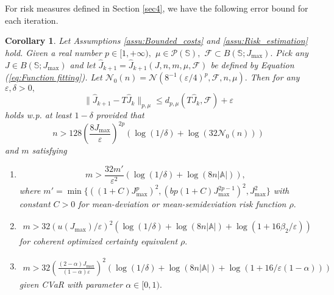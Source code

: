 \documentclass[12pt,technote,onecolumn]{IEEEtran}
\newtheorem{corollary}{Corollary}
\begin{document}
For risk measures defined in Section \ref{sec4}, we have the
following error bound for each iteration.
\begin{corollary}
	\label{cor:Error each iteration} Let Assumptions \ref{assu:Bounded_costs}
	and \ref{assu:Risk_estimation} hold. Given a real number $p\in[1,+\infty),$
	$\mu\in\mathcal{P}(\mathbb{S}),$ $\mathcal{F}\subset B(\mathbb{S};J_{\max}).$
	Pick any $J\in B\left(\mathbb{S};J_{\max}\right)$ and let $\widehat{J}_{k+1}=\widehat{J}_{k+1}\left(J,n,m,\mu,\mathcal{F}\right)$
	be defined by Equation (\ref{eq:Function fitting}). Let $\mathcal{N}_{0}(n)=\mathcal{N}(8^{-1}({\varepsilon}/{4})^{p},\mathcal{F},n,\mu).$
	Then for any $\varepsilon,\delta>0,$	
	\[
	\|\widehat{J}_{k+1}-T\widehat{J}_{k}\|_{p,\mu}\leq d_{p,\mu}(T\widehat{J}_{k},\mathcal{F})+\varepsilon
	\]
	holds w.p. at least $1-\delta$ provided that	
	\[
	n>128\left(\frac{8J_{\max}}{\varepsilon}\right)^{2p}\left(\log\left(1/\delta\right)+\log\left(32\mathcal{N}_{0}\left(n\right)\right)\right)
	\]
	and $m$ satisfying
	\begin{enumerate}
		\item $$
		m>\frac{32m'}{\varepsilon^{2}}\left(\log\left(1/\delta\right)+\log\left(8n\left|\mathbb{A}\right|\right)\right),
		$$
		where 
		$m'=\min\{ ((1+C)J_{\max}^{p})^{2},(bp(1+C)J_{\max}^{2p-1})^{2},J_{\max}^{2}\} $
		with constant $C>0$ for mean-deviation or mean-semideviation risk
		function $\rho.$
		\item 
		\begin{equation*}
		\begin{aligned}
		m>32(u(J_{\max})/\varepsilon)^{2}(\log\left(1/\delta\right)+\log\left(8n\left|\mathbb{A}\right|\right)
		+\log(1+16\beta_{2}/\varepsilon))
		\end{aligned}
		\end{equation*}
		for coherent optimized certainty equivalent $\rho.$
		\item 
		\begin{equation*}
		\begin{aligned}
		m>32\left(\frac{\left(2-\alpha\right)J_{\max}}{\left(1-\alpha\right)\varepsilon}\right)^{2}(\log\left(1/\delta\right)+\log\left(8n\left|\mathbb{A}\right|\right)
		+\log\left(1+16/{\varepsilon\left(1-\alpha\right)}\right))
		\end{aligned}
		\end{equation*}
		given CVaR with parameter $\alpha\in[0,1).$
	\end{enumerate}	
\end{corollary}
\end{document}
